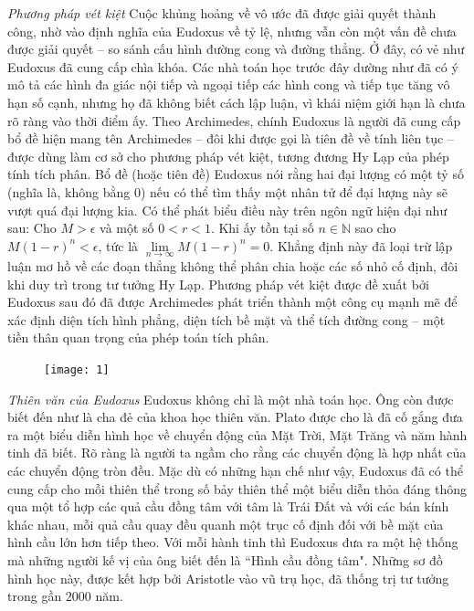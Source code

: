 \begin{multicols}{2}
	\vskip 0.1cm
	\textit{\color{lichsutoanhoc}Phương pháp vét kiệt}
	\vskip 0.1cm
	Cuộc khủng hoảng về vô ước đã được giải quyết thành công, nhờ vào định nghĩa của Eudoxus về tỷ lệ, nhưng vẫn còn một vấn đề chưa được giải quyết -- so sánh cấu hình đường cong và đường thẳng. 
	\vskip 0.1cm
	Ở đây, có vẻ như Eudoxus đã cung cấp chìa khóa.
	\vskip 0.1cm
	Các nhà toán học trước đây dường như đã có ý mô tả các hình đa giác nội tiếp và ngoại tiếp các hình cong và tiếp tục tăng vô hạn số cạnh, nhưng họ đã không biết cách lập luận, vì khái niệm giới hạn là chưa rõ ràng vào thời điểm ấy. 
	\vskip 0.1cm
	Theo Archimedes, chính Eudoxus là người đã cung cấp bổ đề hiện mang tên Archimedes -- đôi khi được gọi là tiên đề về tính liên tục -- được dùng làm cơ sở cho phương pháp vét kiệt, tương đương  Hy Lạp của phép tính tích phân.
	\vskip 0.1cm
	Bổ đề (hoặc tiên đề) Eudoxus nói rằng hai đại lượng có một tỷ số (nghĩa là, không bằng $0$) nếu có thể tìm thấy một nhân tử để đại lượng này sẽ vượt quá đại lượng kia. Có thể phát biểu điều này trên ngôn ngữ hiện đại như sau: Cho $M > \epsilon$  và một số $0 < r < 1$. Khi ấy tồn tại số $n \in \mathbb{N}$  sao cho $M(1-r)^n < \epsilon$, tức là $\mathop {\lim }\limits_{n \to \infty } M{\left( {1 - r} \right)^n} = 0$. 
	\vskip 0.1cm
	Khẳng định này đã loại trừ lập luận mơ hồ về các đoạn thẳng không thể phân chia hoặc các số nhỏ cố định, đôi khi duy trì trong tư tưởng Hy Lạp. 
	\vskip 0.1cm
	Phương pháp vét kiệt được đề xuất bởi Eudoxus sau đó đã được Archimedes phát triển thành một công cụ mạnh mẽ để xác định diện tích hình phẳng, diện tích bề mặt và thể tích đường cong --  một tiền thân quan trọng của phép toán tích phân.
	\begin{figure}[H]
		\vspace*{-5pt}
		\centering
		\captionsetup{labelformat= empty, justification=centering}
		\texttt{[image: 1]}
		\vspace*{-15pt}
	\end{figure}
	\textit{\color{lichsutoanhoc}Thiên văn của Eudoxus} 
	\vskip 0.1cm
	Eudoxus không chỉ là một nhà toán học. Ông còn được biết đến như là cha đẻ của khoa học thiên văn. Plato được cho là đã cố gắng đưa ra một biểu diễn hình học về chuyển động của Mặt Trời, Mặt Trăng và năm hành tinh đã biết. Rõ ràng là người ta ngầm cho rằng các chuyển động là hợp nhất của các chuyển động tròn đều. Mặc dù có những hạn chế như vậy, Eudoxus đã có thể cung cấp cho mỗi thiên thể trong số bảy thiên thể một biểu diễn thỏa đáng thông qua một tổ hợp các quả cầu đồng tâm với tâm là Trái Đất và với các bán kính khác nhau, mỗi quả cầu quay đều quanh một trục cố định đối với bề mặt của hình cầu lớn hơn tiếp theo. Với mỗi hành tinh thì Eudoxus đưa ra một hệ thống mà những người kế vị của ông biết đến là ``Hình cầu đồng tâm". Những sơ đồ hình học này, được kết hợp bởi Aristotle vào vũ trụ học, đã thống trị tư tưởng trong gần $2000$ năm.

\end{multicols}
